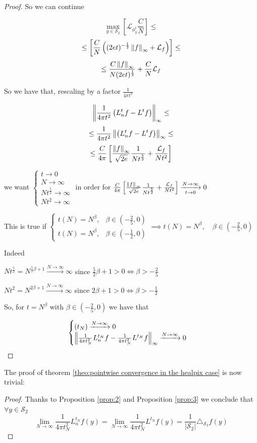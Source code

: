\begin{proof}
	So we can continue
	
	$$ \max _{y\in \mathcal S_2} \left[  \mathcal L_{\phi^t_y} \frac{C}{N} \right]\leq$$
	$$ \leq \left[   \frac{C}{N} \left( (2et)^{-\frac{1}{2}} \left\lVert f\right\rVert_\infty + \mathcal L_f \right)\right]\leq$$
	$$  \leq \frac{C\left\lVert f\right\rVert_\infty}{N(2et)^\frac{1}{2}} +   \frac{C}{N}\mathcal L_f$$
	
	So we have that, rescaling by a factor $\frac{1}{4\pi t^2}$
	
	$$\left\lVert\frac{1}{4\pi t^2}\left(L_n^tf-L^tf\right)\right\rVert_\infty\leq$$
	$$\leq \frac{1}{4\pi t^2}\left\lVert\left(L_n^tf-L^tf\right)\right\rVert_\infty \leq$$
	$$ \leq \frac{C}{4\pi}\left[\frac{\left\lVert f\right\rVert_\infty}{\sqrt{2e}}\frac{1}{Nt^\frac{5}{2}} + \frac{\mathcal L_f}{Nt^2}\right]$$
	
	we want $\begin{cases}
	t \rightarrow 0\\
	N \rightarrow \infty\\
	Nt^\frac{5}{2} \rightarrow \infty\\
	Nt^2 \rightarrow \infty
	\end{cases}$ in order for $ \frac{C}{4\pi}\left[\frac{\left\lVert f\right\rVert_\infty}{\sqrt{2e}}\frac{1}{Nt^\frac{5}{2}} + \frac{\mathcal L_f}{Nt^2}\right] \xrightarrow[t\to 0 ]{N\to\infty}0$
	
	This is true if $\begin{cases}
	t(N) = N^\beta, &\beta\in(-\frac{2}{5}, 0) \\
	t(N) = N^\beta, &\beta\in(-\frac{1}{2}, 0)
	\end{cases} \implies t(N) = N^\beta, \quad \beta\in(-\frac{2}{5}, 0)$
	
	Indeed 
	
	$Nt^\frac{5}{2}=N^{\frac{5}{2}\beta+1}\xrightarrow{N \to \infty} \infty$ since $\frac{5}{2}\beta+1>0 \iff \beta>-\frac{2}{5}$
	
	$Nt^2=N^{2\beta+1}\xrightarrow {N \to \infty} \infty$ since $2\beta+1>0 \iff \beta>-\frac{1}{2}$
	
	So, for $t=N^\beta$ with $\beta\in(-\frac{2}{5}, 0)$ we have that 
	
	$$\begin{cases}
	(t_N)\xrightarrow{N\to\infty}0\\
	\left\lVert\frac{1}{4\pi t_N^2}L_n^{t_N}f-\frac{1}{4\pi t_N^2}L^{t_N}f\right\rVert_\infty  \xrightarrow{N\to\infty}0
	\end{cases}$$
	
\end{proof}

The proof of theorem \ref{theo:pointwise convergence in the healpix case} is now trivial:
\begin{proof}
	Thanks to Proposition \ref{prop:2} and Proposition \ref{prop:3}	we conclude that $\forall y\in\mathcal S_2 $
	$$\lim_{N\to\infty}\frac{1}{4\pi t_N^2} L_n^{t_N}f(y) =  \lim_{N\to\infty}\frac{1}{4\pi t_N^2} L^{t_N}f(y) = \frac{1}{|\mathcal S_2|}\triangle_{\mathcal S_2}f(y) $$
\end{proof}

